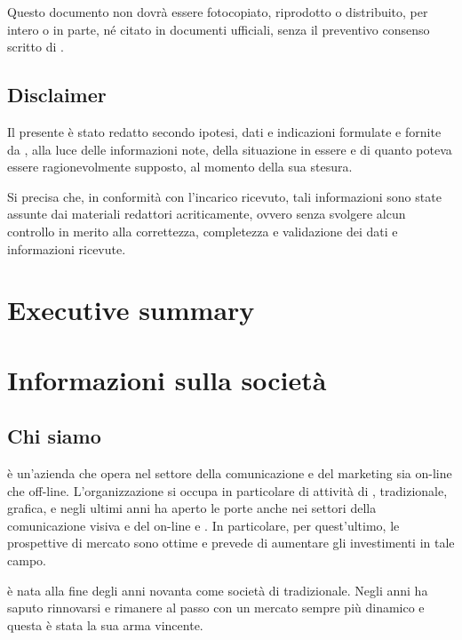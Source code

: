 Questo documento non dovrà essere fotocopiato, riprodotto o distribuito, per intero o in parte, né citato in documenti ufficiali, senza il preventivo consenso scritto di \customer.

\subsection{Disclaimer}
Il presente  è stato redatto secondo ipotesi, dati e indicazioni formulate e fornite da \customer, alla luce delle informazioni note, della situazione in essere e di quanto poteva essere ragionevolmente supposto, al momento della sua stesura.

Si precisa che, in conformità con l'incarico ricevuto, tali informazioni sono state assunte dai materiali redattori acriticamente, ovvero senza svolgere alcun controllo in merito alla correttezza, completezza e validazione dei dati e informazioni ricevute.

\clearpage

\section{Executive summary}\label{sec:summary}

\clearpage

\section{Informazioni sulla società}\label{sec:whoweare}

\subsection{Chi siamo}
\customer è un'azienda che opera nel settore della comunicazione e del marketing sia on-line che off-line. 
L'organizzazione si occupa in particolare di attività di ,  tradizionale, grafica, e negli ultimi anni ha aperto le porte anche nei settori della comunicazione visiva e del \mktg on-line e . In particolare, per quest'ultimo, le prospettive di mercato sono ottime e \customer prevede di aumentare gli investimenti in tale campo.

\customer è nata alla fine degli anni novanta come società di  tradizionale. Negli anni ha saputo rinnovarsi e rimanere al passo con un mercato sempre più dinamico e questa è stata la sua arma vincente.

